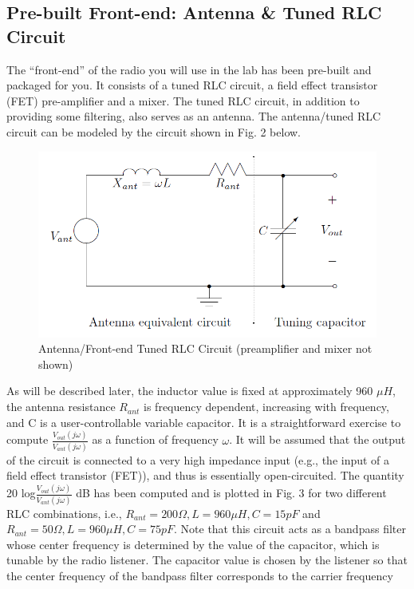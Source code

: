 \documentclass[12pt]{article}
\begin{document}
\subsection{Pre-built Front-end: Antenna \& Tuned RLC Circuit}
The “front-end” of the radio you will use in the lab has been pre-built and packaged for you. It consists
of a tuned RLC circuit, a field effect transistor (FET) pre-amplifier and a mixer. The tuned RLC circuit,
in addition to providing some filtering, also serves as an antenna. The antenna/tuned RLC circuit can be
modeled by the circuit shown in Fig. 2 below.
\begin{figure}[H]
\centering
\includegraphics[scale=0.5]{P2.jpg}
\caption{Antenna/Front-end Tuned RLC Circuit (preamplifier and mixer not shown)}
\end{figure}
\par As will be described later, the inductor value is fixed at approximately 960 $\mu H$, the antenna resistance
$R_{ant}$ is frequency dependent, increasing with frequency, and C is a user-controllable variable capacitor. It
is a straightforward exercise to compute $\frac{V_{out}(j\omega)}{V_{ant}(j\omega)}$ as a function of frequency $\omega$. It will be assumed that the output of the circuit is connected to a very high impedance input (e.g., the input of a field effect transistor (FET)), and thus is essentially open-circuited. The quantity 20 log$\frac{V_{out}(j\omega)}{V_{ant}(j\omega)}$
dB has been computed and is
plotted in Fig. 3 for two different RLC combinations, i.e., $R_{ant}=200\Omega, L=960\mu H, C = 15 pF$ and
$R_{ant}=50\Omega, L=960\mu H, C = 75 pF$. Note that this circuit acts as a bandpass filter whose center frequency is determined by the value of the capacitor, which is tunable by the radio listener. The capacitor value is
chosen by the listener so that the center frequency of the bandpass filter corresponds to the carrier frequency
\end{document}
